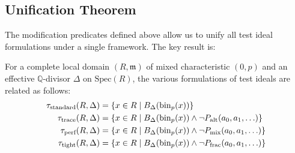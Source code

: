 \subsection{Unification Theorem}

The modification predicates defined above allow us to unify all test ideal formulations under a single framework. The key result is:

\begin{theorem}\label{thm:unification}
For a complete local domain $(R,\mathfrak{m})$ of mixed characteristic $(0,p)$ and an effective $\mathbb{Q}$-divisor $\Delta$ on $\text{Spec}(R)$, the various formulations of test ideals are related as follows:
\begin{align*}
\tau_{\text{standard}}(R,\Delta) &= \{x \in R \mid B_\Delta(\operatorname{bin}_p(x))\} \\
\tau_{\text{trace}}(R,\Delta) &= \{x \in R \mid B_\Delta(\operatorname{bin}_p(x)) \wedge \neg P_{\text{alt}}(a_0, a_1, \ldots)\} \\
\tau_{\text{perf}}(R,\Delta) &= \{x \in R \mid B_\Delta(\operatorname{bin}_p(x)) \wedge \neg P_{\text{mix}}(a_0, a_1, \ldots)\} \\
\tau_{\text{tight}}(R,\Delta) &= \{x \in R \mid B_\Delta(\operatorname{bin}_p(x)) \wedge \neg P_{\text{frac}}(a_0, a_1, \ldots)\}
\end{align*}
\end{theorem}

